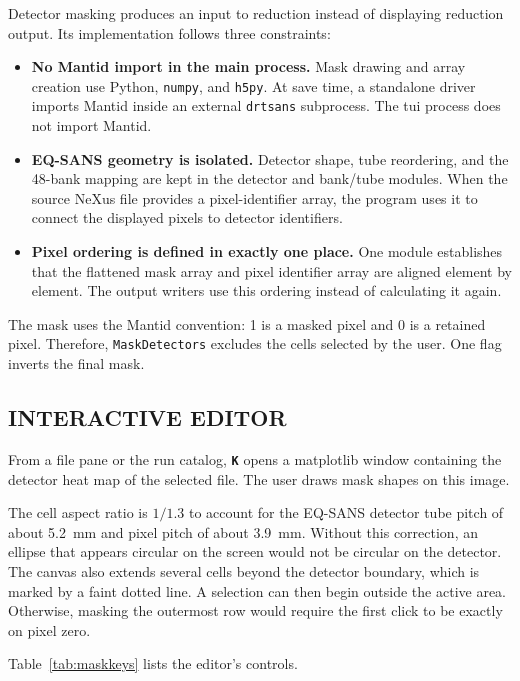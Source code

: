 \documentclass[tm]{ornltm}
\newcommand{\key}[1]{\textbf{\texttt{#1}}}
\begin{document}
Detector masking produces an input to reduction instead of displaying reduction
output. Its implementation follows three constraints:

\begin{itemize}
  \item \textbf{No Mantid import in the main process.} Mask drawing and array
    creation use Python, \texttt{numpy}, and \texttt{h5py}. At save time, a
    standalone driver imports Mantid inside an external \texttt{drtsans}
    subprocess. The \ac{tui} process does not import Mantid.
  \item \textbf{EQ-SANS geometry is isolated.} Detector shape, tube reordering,
    and the 48-bank mapping are kept in the detector and bank/tube modules. When
    the source NeXus file provides a pixel-identifier array, the program uses it
    to connect the displayed pixels to detector identifiers.
  \item \textbf{Pixel ordering is defined in exactly one place.} One module
    establishes that the flattened mask array and pixel identifier array are
    aligned element by element. The output writers use this ordering instead of
    calculating it again.
\end{itemize}

The mask uses the Mantid convention: 1 is a masked pixel and 0 is a retained
pixel. Therefore, \texttt{MaskDetectors} excludes the cells selected by the
user. One flag inverts the final mask.

\subsection{INTERACTIVE EDITOR}

From a file pane or the run catalog, \key{K} opens a matplotlib window containing
the detector heat map of the selected file. The user draws mask shapes on this
image.

The cell aspect ratio is $1/1.3$ to account for the EQ-SANS detector tube pitch
of about 5.2~mm and pixel pitch of about 3.9~mm. Without this correction, an
ellipse that appears circular on the screen would not be circular on the
detector. The canvas also extends several cells beyond the detector boundary,
which is marked by a faint dotted line. A selection can then begin outside the
active area. Otherwise, masking the outermost row would require the first click
to be exactly on pixel zero.

Table~\ref{tab:maskkeys} lists the editor's controls.
\end{document}
